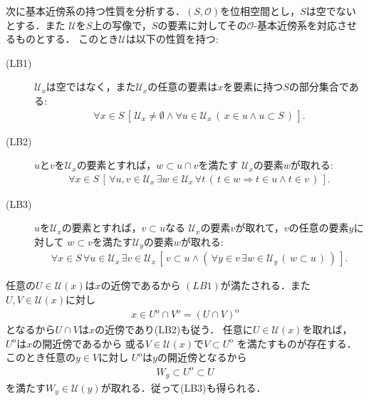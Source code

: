 	次に基本近傍系の持つ性質を分析する．$(S,\mathscr{O})$を位相空間とし，$S$は空でないとする．また
	$\mathcal{U}$を$S$上の写像で，$S$の要素に対してその$\mathscr{O}$-基本近傍系を対応させるものとする．
	このとき$\mathcal{U}$は以下の性質を持つ:
	\begin{description}
		\item[(LB1)] $\mathcal{U}_{x}$は空ではなく，また$\mathcal{U}_{x}$の任意の要素は$x$を要素に持つ$S$の部分集合である:
			\begin{align}
				\forall x \in S\, \left[\, \mathcal{U}_{x} \neq \emptyset 
				\wedge \forall u \in \mathcal{U}_{x}\, (\, x \in u \wedge u \subset S\, )\, \right].
			\end{align}

		\item[(LB2)] $u$と$v$を$\mathcal{U}_{x}$の要素とすれば，$w \subset u \cap v$を満たす
			$\mathcal{U}_{x}$の要素$w$が取れる:
			\begin{align}
				\forall x \in S\, 
				\left[\, \forall u,v \in \mathcal{U}_{x}\, \exists w \in \mathcal{U}_{x}\,
				\forall t\, \left(\, t \in w \Longrightarrow t \in u \wedge t \in v\, \right)\, \right].
			\end{align}
			
		\item[(LB3)] $u$を$\mathcal{U}_{x}$の要素とすれば，$v \subset u$なる
			$\mathcal{U}_{x}$の要素$v$が取れて，$v$の任意の要素$y$に対して
			$w \subset v$を満たす$\mathcal{U}_{y}$の要素$w$が取れる:
			\begin{align}
				\forall x \in S\, \forall u \in \mathcal{U}_{x}\, \exists v \in \mathcal{U}_{x}\,
				\left[\, v \subset u \wedge \left(\, \forall y \in v\,
				\exists w \in \mathcal{U}_{y}\, (\, w \subset u\, )\, \right)\, \right].
			\end{align}
	\end{description}
	
	任意の$U \in \mathcal{U}(x)$は$x$の近傍であるから
				$(LB1)$が満たされる．また$U,V \in \mathcal{U}(x)$に対し
				\begin{align}
					x \in U^{\mathrm{o}} \cap V^{\mathrm{o}} = (U \cap V)^{\mathrm{o}}
				\end{align}
				となるから$U \cap V$は$x$の近傍であり(LB2)も従う．
				任意に$U \in \mathcal{U}(x)$を取れば，
				$U^{\mathrm{o}}$は$x$の開近傍であるから
				或る$V \in \mathcal{U}(x)$で$V \subset U^{\mathrm{o}}$
				を満たすものが存在する．このとき任意の$y \in V$に対し
				$U^{\mathrm{o}}$は$y$の開近傍となるから
				\begin{align}
					W_y \subset U^{\mathrm{o}} \subset U
				\end{align}
				を満たす$W_y \in \mathcal{U}(y)$が取れる．従って(LB3)も得られる．
				
